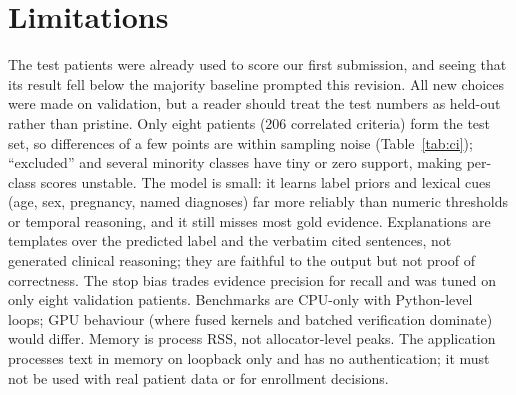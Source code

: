 \section{Limitations}\label{sec:limits}
The test patients were already used to score our first submission, and seeing that its result fell below the majority baseline prompted this revision. All new choices were made on validation, but a reader should treat the test numbers as held-out rather than pristine. Only eight patients (206 correlated criteria) form the test set, so differences of a few points are within sampling noise (Table~\ref{tab:ci}); ``excluded'' and several minority classes have tiny or zero support, making per-class scores unstable. The model is small: it learns label priors and lexical cues (age, sex, pregnancy, named diagnoses) far more reliably than numeric thresholds or temporal reasoning, and it still misses most gold evidence. Explanations are templates over the predicted label and the verbatim cited sentences, not generated clinical reasoning; they are faithful to the output but not proof of correctness. The stop bias trades evidence precision for recall and was tuned on only eight validation patients. Benchmarks are CPU-only with Python-level loops; GPU behaviour (where fused kernels and batched verification dominate) would differ. Memory is process RSS, not allocator-level peaks. The application processes text in memory on loopback only and has no authentication; it must not be used with real patient data or for enrollment decisions.

